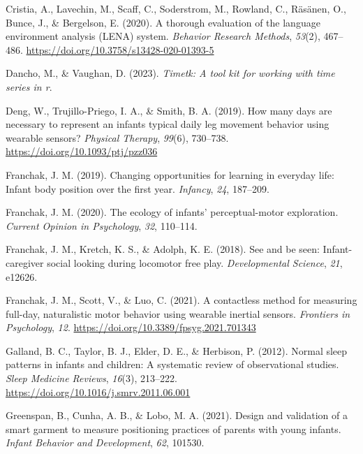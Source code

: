 \documentclass[
  man]{apa6}
\newlength{\cslhangindent}
\newlength{\cslentryspacingunit} %
\newenvironment{CSLReferences}[2] %
 {%
  \setlength{\parindent}{0pt}
  \ifodd #1
  \let\oldpar\par
  \def\par{\hangindent=\cslhangindent\oldpar}
  \fi
  \setlength{\parskip}{#2\cslentryspacingunit}
 }%
 {}
\begin{document}
\begin{CSLReferences}{1}{0}
\leavevmode{}%
Cristia, A., Lavechin, M., Scaff, C., Soderstrom, M., Rowland, C., Räsänen, O., Bunce, J., \& Bergelson, E. (2020). A thorough evaluation of the language environment analysis ({LENA}) system. \emph{Behavior Research Methods}, \emph{53}(2), 467--486. \url{https://doi.org/10.3758/s13428-020-01393-5}

\leavevmode{}%
Dancho, M., \& Vaughan, D. (2023). \emph{Timetk: A tool kit for working with time series in r}.

\leavevmode{}%
Deng, W., Trujillo-Priego, I. A., \& Smith, B. A. (2019). How many days are necessary to represent an infant{\textquotesingle}s typical daily leg movement behavior using wearable sensors? \emph{Physical Therapy}, \emph{99}(6), 730--738. \url{https://doi.org/10.1093/ptj/pzz036}

\leavevmode{}%
Franchak, J. M. (2019). Changing opportunities for learning in everyday life: Infant body position over the first year. \emph{Infancy}, \emph{24}, 187--209.

\leavevmode{}%
Franchak, J. M. (2020). The ecology of infants' perceptual-motor exploration. \emph{Current Opinion in Psychology}, \emph{32}, 110--114.

\leavevmode{}%
Franchak, J. M., Kretch, K. S., \& Adolph, K. E. (2018). See and be seen: Infant-caregiver social looking during locomotor free play. \emph{Developmental Science}, \emph{21}, e12626.

\leavevmode{}%
Franchak, J. M., Scott, V., \& Luo, C. (2021). A contactless method for measuring full-day, naturalistic motor behavior using wearable inertial sensors. \emph{Frontiers in Psychology}, \emph{12}. \url{https://doi.org/10.3389/fpsyg.2021.701343}

\leavevmode{}%
Galland, B. C., Taylor, B. J., Elder, D. E., \& Herbison, P. (2012). Normal sleep patterns in infants and children: A systematic review of observational studies. \emph{Sleep Medicine Reviews}, \emph{16}(3), 213--222. \url{https://doi.org/10.1016/j.smrv.2011.06.001}

\leavevmode{}%
Greenspan, B., Cunha, A. B., \& Lobo, M. A. (2021). Design and validation of a smart garment to measure positioning practices of parents with young infants. \emph{Infant Behavior and Development}, \emph{62}, 101530.


\end{CSLReferences}
\end{document}
